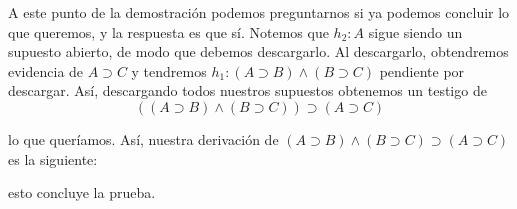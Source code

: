 \documentclass{article}
\begin{document}
\begin{example}
    A este punto de la demostración podemos preguntarnos si ya podemos
    concluir lo que queremos, y la respuesta es que sí. Notemos que
    $h_2:A$ sigue siendo un supuesto abierto, de modo que debemos descargarlo.
    Al descargarlo, obtendremos evidencia de $A \supset C$ y tendremos
    $h_1 : (A \supset B) \land (B \supset C)$ pendiente por descargar.
    Así, descargando todos nuestros supuestos obtenemos un testigo de 
    $$
    ((A \supset B) \land (B \supset C)) \supset (A \supset C)
    $$

    lo que queríamos. Así, nuestra derivación de $(A \supset B) \land (B \supset C) \supset (A \supset C)$ es la siguiente:

    \begin{prooftree}
    \end{prooftree}

    esto concluye la prueba.
\end{example}
\end{document}
